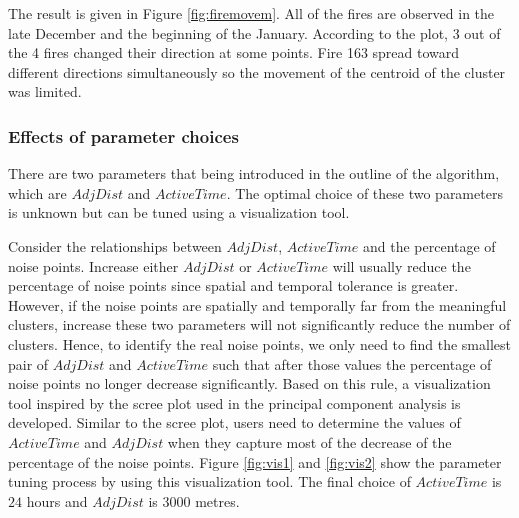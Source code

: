 The result is given in Figure \ref{fig:firemovem}. All of the fires are
observed in the late December and the beginning of the January.
According to the plot, 3 out of the 4 fires changed their direction at
some points. Fire 163 spread toward different directions simultaneously
so the movement of the centroid of the cluster was limited.

\hypertarget{effects-of-parameter-choices}{%
\subsubsection{Effects of parameter
choices}\label{effects-of-parameter-choices}}

There are two parameters that being introduced in the outline of the
algorithm, which are \(AdjDist\) and \(ActiveTime\). The optimal choice
of these two parameters is unknown but can be tuned using a
visualization tool.

Consider the relationships between \(AdjDist\), \(ActiveTime\) and the
percentage of noise points. Increase either \(AdjDist\) or
\(ActiveTime\) will usually reduce the percentage of noise points since
spatial and temporal tolerance is greater. However, if the noise points
are spatially and temporally far from the meaningful clusters, increase
these two parameters will not significantly reduce the number of
clusters. Hence, to identify the real noise points, we only need to find
the smallest pair of \(AdjDist\) and \(ActiveTime\) such that after
those values the percentage of noise points no longer decrease
significantly. Based on this rule, a visualization tool inspired by the
scree plot used in the principal component analysis is developed.
Similar to the scree plot, users need to determine the values of
\(ActiveTime\) and \(AdjDist\) when they capture most of the decrease of
the percentage of the noise points. Figure \ref{fig:vis1} and
\ref{fig:vis2} show the parameter tuning process by using this
visualization tool. The final choice of \(ActiveTime\) is \(24\) hours
and \(AdjDist\) is \(3000\) metres.

